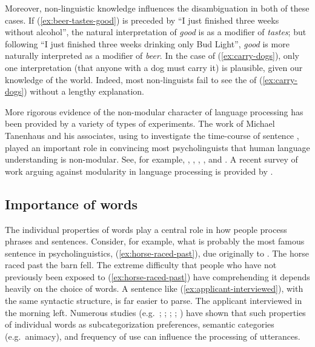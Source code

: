 \documentclass[output=paper
	        ,collection
	        ,collectionchapter
 	        ,biblatex
                ,babelshorthands
                ,newtxmath
                ,draftmode
                ,colorlinks, citecolor=brown
]{langscibook}
\begin{document}
Moreover, non-linguistic knowledge influences the disambiguation in both of these cases.  If (\ref{ex:beer-tastes-good}) is preceded by ``I just finished three weeks without alcohol'', the natural interpretation of \emph{good} is as a modifier of \emph{tastes}; but following ``I just finished three weeks drinking only Bud Light'', \emph{good} is more naturally interpreted as a modifier of \emph{beer}.  In the case of (\ref{ex:carry-dogs}), only one interpretation (that anyone with a dog must carry it) is plausible, given our knowledge of the world.  Indeed, most non-linguists fail to see the  of (\ref{ex:carry-dogs}) without a lengthy explanation.  

More rigorous evidence of the non-modular character of language processing has been provided by a variety of types of experiments.  The work of Michael Tanenhaus  and his associates, using  to investigate the time-course of sentence , played an important role in convincing most psycholinguists that human language understanding is non-modular.  See, for example, \citet{EberhardEtal95}, \citet{McMurrayEtal2008}, \citet{TSKES95a}, \citet{TSKES96a}, and \citet{TanenhausTrueswell95}. A recent survey of work arguing against modularity in language processing is provided by \citet{SpevackEtal2018}.  

\subsection{Importance of words}
\label{sec-importance-of-words}

The individual properties of words play a central role in how people process phrases and sentences.  Consider, for example, what is probably the most famous sentence in psycholinguistics, (\ref{ex:horse-raced-past}), due originally to \citet{Bever70}.\addpages
\ea\label{ex:horse-raced-past}
The horse raced past the barn fell.
\z
The extreme difficulty that people who have not previously been exposed to (\ref{ex:horse-raced-past}) have comprehending it depends heavily on the choice of words.  A sentence like (\ref{ex:applicant-interviewed}), with the same syntactic structure, is far easier to parse.
\ea\label{ex:applicant-interviewed}
The applicant interviewed in the morning left.
\z
Numerous studies (e.g.\ \citealt{FordEtal82}; \citealt{TrueswellEtal93}; \citealt{MPS94a-u}; \citealt{BresnanEtal2007}; \citealt{WasowEtal2011}) have shown that such properties of individual words as subcategorization preferences, semantic categories (e.g.\ animacy), and frequency of use can influence the processing of utterances.  
\end{document}
